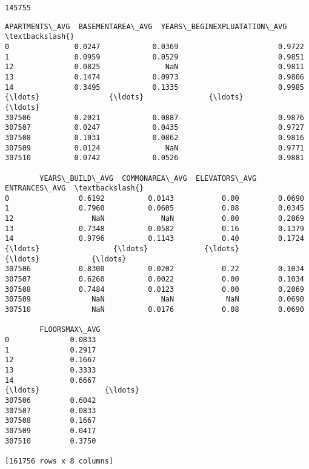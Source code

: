 \documentclass[11pt]{article}
\makeatletter
\newcommand{\boxspacing}{\kern\kvtcb@left@rule\kern\kvtcb@boxsep}
\newcommand{\prompt}[4]{
        {\ttfamily\llap{{\color{#2}[#3]:\hspace{3pt}#4}}\vspace{-\baselineskip}}
    }
\makeatother
\begin{document}
    \begin{Verbatim}[commandchars=\\\{\}]
145755
    \end{Verbatim}

            \begin{tcolorbox}[breakable, size=fbox, boxrule=.5pt, pad at break*=1mm, opacityfill=0]
\prompt{Out}{outcolor}{65}{\boxspacing}
\begin{Verbatim}[commandchars=\\\{\}]
        APARTMENTS\_AVG  BASEMENTAREA\_AVG  YEARS\_BEGINEXPLUATATION\_AVG  \textbackslash{}
0               0.0247            0.0369                       0.9722
1               0.0959            0.0529                       0.9851
12              0.0825               NaN                       0.9811
13              0.1474            0.0973                       0.9806
14              0.3495            0.1335                       0.9985
{\ldots}                {\ldots}               {\ldots}                          {\ldots}
307506          0.2021            0.0887                       0.9876
307507          0.0247            0.0435                       0.9727
307508          0.1031            0.0862                       0.9816
307509          0.0124               NaN                       0.9771
307510          0.0742            0.0526                       0.9881

        YEARS\_BUILD\_AVG  COMMONAREA\_AVG  ELEVATORS\_AVG  ENTRANCES\_AVG  \textbackslash{}
0                0.6192          0.0143           0.00         0.0690
1                0.7960          0.0605           0.08         0.0345
12                  NaN             NaN           0.00         0.2069
13               0.7348          0.0582           0.16         0.1379
14               0.9796          0.1143           0.40         0.1724
{\ldots}                 {\ldots}             {\ldots}            {\ldots}            {\ldots}
307506           0.8300          0.0202           0.22         0.1034
307507           0.6260          0.0022           0.00         0.1034
307508           0.7484          0.0123           0.00         0.2069
307509              NaN             NaN            NaN         0.0690
307510              NaN          0.0176           0.08         0.0690

        FLOORSMAX\_AVG
0              0.0833
1              0.2917
12             0.1667
13             0.3333
14             0.6667
{\ldots}               {\ldots}
307506         0.6042
307507         0.0833
307508         0.1667
307509         0.0417
307510         0.3750

[161756 rows x 8 columns]
\end{Verbatim}
\end{tcolorbox}
        
\end{document}
